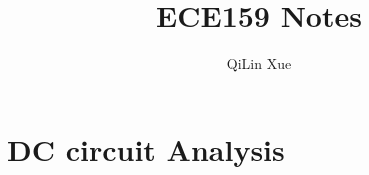 \documentclass{article}
\title{ECE159 Notes}
\author{QiLin Xue}
\begin{document}
    \maketitle
    \tableofcontents
    \section{DC circuit Analysis}
\end{document}
